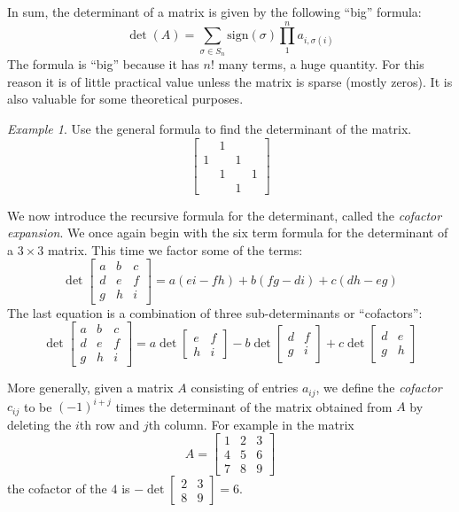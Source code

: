 \documentclass[11pt,oneside]{amsbook}
\theoremstyle{definition}
\theoremstyle{plain}
\theoremstyle{definition}
\theoremstyle{remark}
\newtheorem{example}[theorem]{Example}
\numberwithin{equation}{section}
\numberwithin{figure}{section}
\begin{document}
In sum, the determinant of a matrix is given by the following ``big'' formula:
\[\det(A)=
  \sum_{\sigma\in S_n}\mathrm{sign}(\sigma)\prod_1^na_{i,\sigma(i)}
\]
The formula is ``big'' because it has $n!$ many terms, a huge quantity. For this reason it is of little practical value unless the matrix is sparse (mostly zeros). It is also valuable for some theoretical purposes.

\begin{example}
  Use the general formula to find the determinant of the matrix.
  \[\begin{bmatrix}&1&&\\1&&1\\&1&&1\\&&1\end{bmatrix}
  \]
\end{example}

We now introduce the recursive formula for the determinant, called the \emph{cofactor expansion}. We once again begin with the six term formula for the determinant of a $3\times3$ matrix. This time we factor some of the terms:
\[\det\begin{bmatrix}a&b&c\\d&e&f\\g&h&i\end{bmatrix}
  =a(ei-fh)+b(fg-di)+c(dh-eg)
\]
The last equation is a combination of three sub-determinants or ``cofactors'':
\[\det\begin{bmatrix}a&b&c\\d&e&f\\g&h&i\end{bmatrix}
  =a\det\begin{bmatrix}e&f\\h&i\end{bmatrix}
  -b\det\begin{bmatrix}d&f\\g&i\end{bmatrix}
  +c\det\begin{bmatrix}d&e\\g&h\end{bmatrix}
\]

More generally, given a matrix $A$ consisting of entries $a_{ij}$, we define the \emph{cofactor} $c_{ij}$ to be $(-1)^{i+j}$ times the determinant of the matrix obtained from $A$ by deleting the $i$th row and $j$th column. For example in the matrix
\[A=\begin{bmatrix}1&2&3\\4&5&6\\7&8&9\end{bmatrix}
\]
the cofactor of the $4$ is $-\det\begin{bmatrix}2&3\\8&9\end{bmatrix}=6$.
\end{document}
